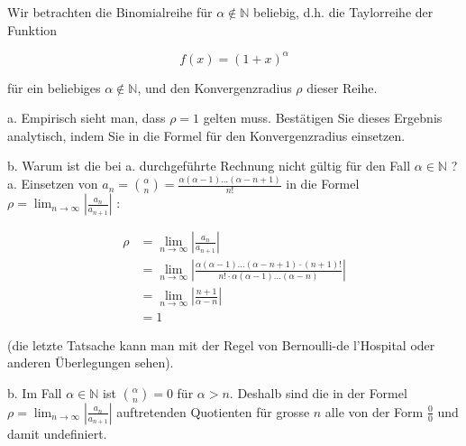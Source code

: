 \begin{example}
    Wir betrachten die Binomialreihe für $\alpha \notin \mathbb{N}$ beliebig, d.h. die Taylorreihe der Funktion

    $$
    f(x)=(1+x)^{\alpha}
    $$
    
    für ein beliebiges $\alpha \notin \mathbb{N}$, und den Konvergenzradius $\rho$ dieser Reihe.
    
    a. Empirisch sieht man, dass $\rho=1$ gelten muss. Bestätigen Sie dieses Ergebnis analytisch, indem Sie in die Formel für den Konvergenzradius einsetzen.
    
    b. Warum ist die bei a. durchgeführte Rechnung nicht gültig für den Fall $\alpha \in \mathbb{N}$ ?
\tcblower
a. Einsetzen von $a_{n}=\binom{\alpha}{n}=\frac{\alpha(\alpha-1) \ldots(\alpha-n+1)}{n!}$ in die Formel $\rho=\lim _{n \rightarrow \infty}\left|\frac{a_{n}}{a_{n+1}}\right|$ :

$$
\begin{aligned}
\rho & =\lim _{n \rightarrow \infty}\left|\frac{a_{n}}{a_{n+1}}\right| \\
& =\lim _{n \rightarrow \infty}\left|\frac{\alpha(\alpha-1) \ldots(\alpha-n+1) \cdot(n+1)!}{n!\cdot \alpha(\alpha-1) \ldots(\alpha-n)}\right| \\
& =\lim _{n \rightarrow \infty}\left|\frac{n+1}{\alpha-n}\right| \\
& =1
\end{aligned}
$$

(die letzte Tatsache kann man mit der Regel von Bernoulli-de l'Hospital oder anderen Überlegungen sehen).

b. Im Fall $\alpha \in \mathbb{N}$ ist $\binom{\alpha}{n}=0$ für $\alpha>n$. Deshalb sind die in der Formel $\rho=\lim _{n \rightarrow \infty}\left|\frac{a_{n}}{a_{n+1}}\right|$ auftretenden Quotienten für grosse $n$ alle von der Form $\frac{0}{0}$ und damit undefiniert.
\end{example}


